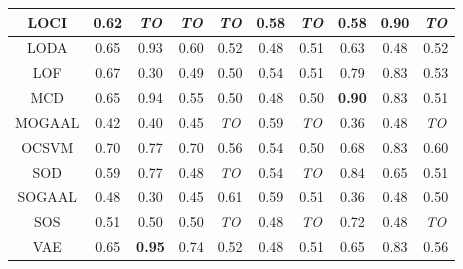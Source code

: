 \begin{table*}[!t]
\begin{tabular}{|c|c|c|c|c|c|c|c|c|c|}
\hline
            LOCI &                0.62 &      \textit{TO} &     \textit{TO} &    \textit{TO} &           0.58 &   \textit{TO} &                0.58 &            0.90 &    \textit{TO} \\
\hline
            LODA &                0.65 &             0.93 &            0.60 &           0.52 &           0.48 &          0.51 &                0.63 &            0.48 &           0.52 \\
\hline
            LOF &                0.67 &             0.30 &            0.49 &           0.50 &           0.54 &          0.51 &                0.79 &            0.83 &           0.53 \\
\hline
            MCD &                0.65 &             0.94 &            0.55 &           0.50 &           0.48 &          0.50 &       \textbf{0.90} &            0.83 &           0.51 \\
\hline
        MOGAAL &                0.42 &             0.40 &            0.45 &    \textit{TO} &           0.59 &   \textit{TO} &                0.36 &            0.48 &    \textit{TO} \\
\hline
            OCSVM &                0.70 &             0.77 &            0.70 &           0.56 &           0.54 &          0.50 &                0.68 &            0.83 &           0.60 \\
\hline
            SOD &                0.59 &             0.77 &            0.48 &    \textit{TO} &           0.54 &   \textit{TO} &                0.84 &            0.65 &           0.51 \\
\hline
        SOGAAL &                0.48 &             0.30 &            0.45 &           0.61 &           0.59 &          0.51 &                0.36 &            0.48 &           0.50 \\
\hline
            SOS &                0.51 &             0.50 &            0.50 &    \textit{TO} &           0.48 &   \textit{TO} &                0.72 &            0.48 &    \textit{TO} \\
\hline
            VAE &                0.65 &    \textbf{0.95} &            0.74 &           0.52 &           0.48 &          0.51 &                0.65 &            0.83 &           0.56 \\
\hline
\end{tabular}    
\end{table*}


